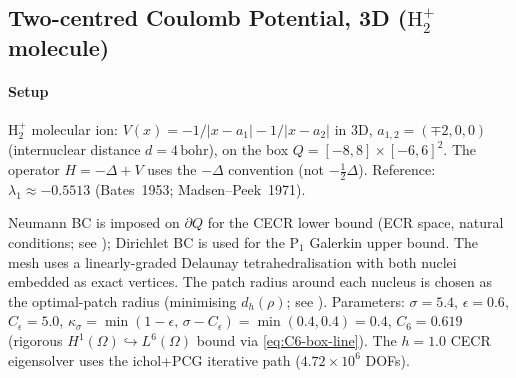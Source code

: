 \documentclass[11pt]{article}
\theoremstyle{plain}
\theoremstyle{definition}
\theoremstyle{remark}
\begin{document}
\subsection[Two-centred Coulomb Potential, 3D (H2+ molecule)]{Two-centred Coulomb Potential, 3D
(\texorpdfstring{$\mathrm{H}_2^+$}{H2+} molecule)}
\label{subsec:num-twocenter-3d}

\paragraph{Setup}
$\mathrm{H}_2^+$ molecular ion:
$V(x) = -1/|x-a_1|-1/|x-a_2|$ in 3D,
$a_{1,2}=(\mp 2,0,0)$ (internuclear distance $d=4\,\text{bohr}$),
on the box $Q=[-8,8]\times[-6,6]^2$.
The operator $H=-\Delta + V$ uses the $-\Delta$ convention
(not $-\tfrac{1}{2}\Delta$).
Reference: $\lambda_1\approx -0.5513$ (Bates~1953; Madsen--Peek~1971).

Neumann BC is imposed on $\partial Q$ for the CECR lower bound
(ECR space, natural conditions; see );
Dirichlet BC is used for the $\mathrm{P}_1$ Galerkin upper bound.
The mesh uses a linearly-graded Delaunay tetrahedralisation
with both nuclei embedded as exact vertices.
The patch radius around each nucleus is chosen as the optimal-patch radius
(minimising $d_h(\rho)$; see ).
Parameters: $\sigma=5.4$, $\epsilon=0.6$, $C_\epsilon=5.0$,
$\kappa_\sigma=\min(1-\epsilon,\,\sigma-C_\epsilon)=\min(0.4,0.4)=0.4$,
$C_6=0.619$ (rigorous $H^1(\Omega)\hookrightarrow L^6(\Omega)$ bound via \eqref{eq:C6-box-line}).
The $h=1.0$ CECR eigensolver uses the ichol+PCG iterative path
($4.72{\times}10^6$ DOFs).
\end{document}
